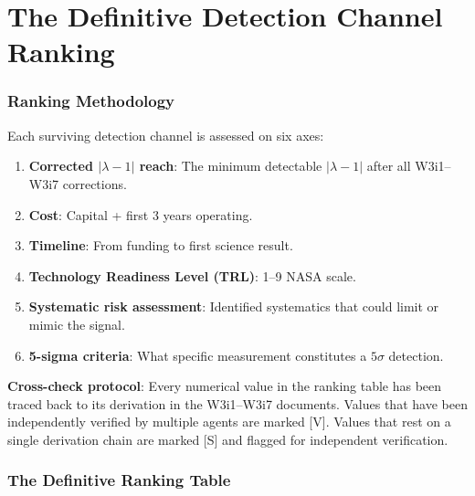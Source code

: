 \documentclass[11pt]{article}
\newcommand{\lam}{\lambda}
\newcommand{\lbone}{|\lam - 1|}
\theoremstyle{definition}
\theoremstyle{remark}
\begin{document}
\part{The Definitive Detection Channel Ranking}
\label{part:ranking}

\section{Ranking Methodology}
\label{sec:methodology}

Each surviving detection channel is assessed on six axes:

\begin{enumerate}[nosep]
\item[(a)] \textbf{Corrected $\lbone$ reach}: The minimum detectable
  $|\lambda-1|$ after all W3i1--W3i7 corrections.
\item[(b)] \textbf{Cost}: Capital + first 3 years operating.
\item[(c)] \textbf{Timeline}: From funding to first science result.
\item[(d)] \textbf{Technology Readiness Level (TRL)}: 1--9 NASA scale.
\item[(e)] \textbf{Systematic risk assessment}: Identified systematics
  that could limit or mimic the signal.
\item[(f)] \textbf{5-sigma criteria}: What specific measurement
  constitutes a $5\sigma$ detection.
\end{enumerate}

\textbf{Cross-check protocol}: Every numerical value in the ranking
table has been traced back to its derivation in the W3i1--W3i7 documents.
Values that have been independently verified by multiple agents are
marked [V]. Values that rest on a single derivation chain are marked
[S] and flagged for independent verification.

\section{The Definitive Ranking Table}
\label{sec:ranking_table}
\end{document}
